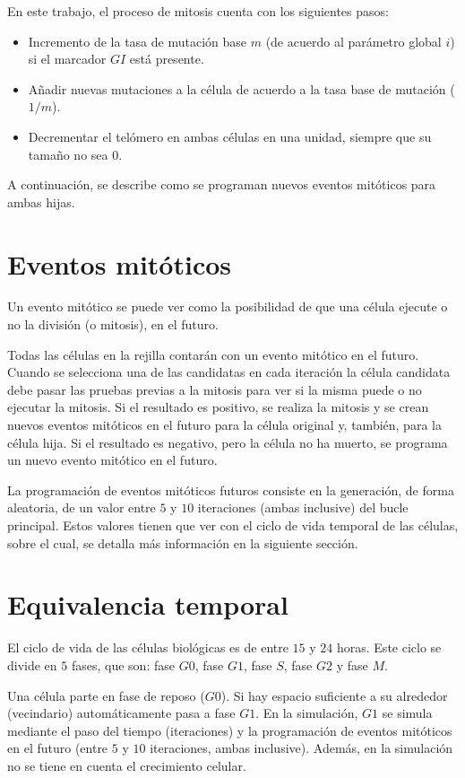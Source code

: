 En este trabajo, el proceso de mitosis cuenta con los siguientes pasos:

\begin{itemize}
    \item Incremento de la tasa de mutación base $m$ (de acuerdo al parámetro global $i$) si el marcador
    $GI$ está presente.
    \item Añadir nuevas mutaciones a la célula de acuerdo a la tasa base de mutación ($1/m$).
    \item Decrementar el telómero en ambas células en una unidad, siempre que su tamaño no sea 0.
\end{itemize}

A continuación, se describe como se programan nuevos eventos mitóticos para ambas hijas.

\section{Eventos mitóticos}

Un evento mitótico se puede ver como la posibilidad de que una célula ejecute o no la división (o mitosis),
en el futuro.

Todas las células en la rejilla contarán con un evento mitótico en el futuro. Cuando se selecciona una
de las candidatas en cada iteración la célula candidata debe pasar las pruebas previas a la mitosis para ver
si la misma puede o no ejecutar la mitosis. Si el resultado es positivo, se realiza la mitosis y se crean
nuevos eventos mitóticos en el futuro para la célula original y, también, para la célula hija.
Si el resultado es negativo, pero la célula no ha muerto, se programa un nuevo evento mitótico en el futuro.

La programación de eventos mitóticos futuros consiste en la generación, de forma aleatoria, de un valor
entre $5$ y $10$ iteraciones (ambas inclusive) del bucle principal. Estos valores tienen que ver con el ciclo de vida
temporal de las células, sobre el cual, se detalla más información en la siguiente sección.

\section{Equivalencia temporal}

El ciclo de vida de las células biológicas es de entre $15$ y $24$ horas. Este ciclo se divide en $5$ fases, que son:
fase $G0$, fase $G1$, fase $S$, fase $G2$ y fase $M$.

Una célula parte en fase de reposo ($G0$). Si hay espacio suficiente a su alrededor (vecindario) automáticamente pasa
a fase $G1$. En la simulación, $G1$ se simula mediante el paso del tiempo (iteraciones) y la programación de
eventos mitóticos en el futuro (entre $5$ y $10$ iteraciones, ambas inclusive). Además, en la simulación no se
tiene en cuenta el crecimiento celular.

